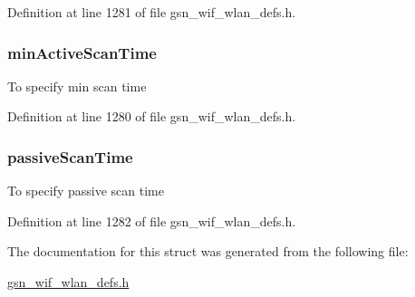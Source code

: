 Definition at line 1281 of file gsn\_\-wif\_\-wlan\_\-defs.h.

\hypertarget{a00401_adcfb1c54474a6d75b454702ff1411c5b}{
\subsubsection[{minActiveScanTime}]{ {\bf minActiveScanTime}}}
\label{a00401_adcfb1c54474a6d75b454702ff1411c5b}
To specify min scan time 

Definition at line 1280 of file gsn\_\-wif\_\-wlan\_\-defs.h.

\hypertarget{a00401_acdde142bdd4db3e1da825d691e9513ea}{
\subsubsection[{passiveScanTime}]{ {\bf passiveScanTime}}}
\label{a00401_acdde142bdd4db3e1da825d691e9513ea}
To specify passive scan time 

Definition at line 1282 of file gsn\_\-wif\_\-wlan\_\-defs.h.



The documentation for this struct was generated from the following file:\begin{DoxyCompactItemize}
\item 
\hyperlink{a00613}{gsn\_\-wif\_\-wlan\_\-defs.h}\end{DoxyCompactItemize}
